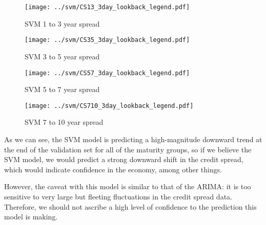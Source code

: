 \documentclass[12pt]{article}
\begin{document}
        \begin{minipage}{0.5\textwidth}
            \begin{figure}[H]
                \centering
                \caption{SVM 1 to 3 year spread}
                \texttt{[image: ../svm/CS13\_3day\_lookback\_legend.pdf]}
                \label{fig:SVM13}
            \end{figure}
        \end{minipage}
        \begin{minipage}{0.5\textwidth}
            \begin{figure}[H]
                \centering
                \caption{SVM 3 to 5 year spread}
                \texttt{[image: ../svm/CS35\_3day\_lookback\_legend.pdf]}
                \label{fig:SVM35}
            \end{figure}
        \end{minipage}

        \begin{minipage}{0.5\textwidth}
            \begin{figure}[H]
                \centering
                \caption{SVM 5 to 7 year spread}
                \texttt{[image: ../svm/CS57\_3day\_lookback\_legend.pdf]}
                \label{fig:SVM57}
            \end{figure}
        \end{minipage}
        \begin{minipage}{0.5\textwidth}
            \begin{figure}[H]
                \centering
                \caption{SVM 7 to 10 year spread}
                \texttt{[image: ../svm/CS710\_3day\_lookback\_legend.pdf]}
                \label{fig:SVM710}
            \end{figure}
        \end{minipage}

        As we can see, the SVM model is predicting a high-magnitude downward trend at the end of the validation set for all of the maturity groups,
        so if we believe the SVM model, we would predict a strong downward shift in the credit spread, which would indicate confidence in the economy, among other things.

        However, the caveat with this model is similar to that of the ARIMA: it is too sensitive to very large but fleeting fluctuations in the credit spread data.
        Therefore, we should not ascribe a high level of confidence to the prediction this model is making.
\end{document}
